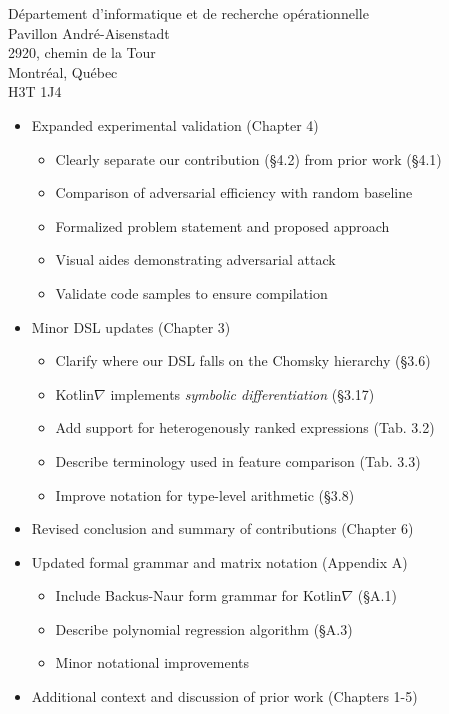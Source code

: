 \documentclass{letter}
\begin{document}
\begin{letter}{D\'epartement d'informatique et de recherche op\'erationnelle \\ Pavillon Andr\'e-Aisenstadt \\ 2920, chemin de la Tour \\ Montr\'eal, Qu\'ebec \\ H3T 1J4}
        \begin{itemize}
            \item Expanded experimental validation (Chapter 4)
                \begin{itemize}
                    \item Clearly separate our contribution (\S 4.2) from prior work (\S 4.1)
                    \item Comparison of adversarial efficiency with random baseline
                    \item Formalized problem statement and proposed approach
                    \item Visual aides demonstrating adversarial attack
                    \item Validate code samples to ensure compilation
                \end{itemize}
            \item Minor DSL updates (Chapter 3)
                \begin{itemize}
                    \item Clarify where our DSL falls on the Chomsky hierarchy (\S 3.6)
                    \item Kotlin$\nabla$ implements \textit{symbolic differentiation} (\S 3.17)
                    \item Add support for heterogenously ranked expressions (Tab. 3.2)
                    \item Describe terminology used in feature comparison (Tab. 3.3)
                    \item Improve notation for type-level arithmetic (\S 3.8)
                \end{itemize}
            \item Revised conclusion and summary of contributions (Chapter 6)
            \item Updated formal grammar and matrix notation (Appendix A)
            \begin{itemize}
                \item Include Backus-Naur form grammar for Kotlin$\nabla$ (\S A.1)
                \item Describe polynomial regression algorithm (\S A.3)
                \item Minor notational improvements
            \end{itemize}
            \item Additional context and discussion of prior work (Chapters 1-5)
                \begin{itemize}

\end{itemize}
\end{itemize}
\end{letter}
\end{document}
